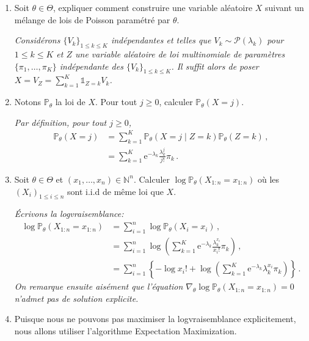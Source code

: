 \documentclass[a4paper,10pt,fleqn]{article}
\newcommand{\1}{\ensuremath{\mathbbm{1}}}
\begin{document}
\begin{enumerate}
\item Soit $\theta\in\Theta$, expliquer comment construire une variable al\'eatoire $X$ suivant un m\'elange de lois de Poisson param\'etr\'e par $\theta$.

\vspace{.2cm}

{\em Consid\'erons $\{V_k\}_{1\leq k\leq K}$ ind\'ependantes et telles que $V_k\sim \mathcal{P}(\lambda_k)$ pour $1\leq k\leq K$ et $Z$ une variable al\'eatoire de loi multinomiale de param\`etres $\{\pi_1, \ldots,\pi_K\}$ ind\'ependante des $\{V_k\}_{1\leq k\leq K}$. Il suffit alors de poser $X = V_Z = \sum_{k=1}^K \mathds{1}_{Z=k}V_k$.}

\item Notons $\mathbb{P}_\theta$ la loi de $X$. Pour tout $j\geq 0$, calculer $\mathbb{P}_\theta(X=j)$.

\vspace{.2cm}

{\em Par d\'efinition, pour tout $j\geq 0$,
\begin{align*}
\mathbb{P}_\theta\left(X=j\right) &= \sum_{k=1}^K \mathbb{P}_\theta\left(X=j \middle |Z = k\right)\mathbb{P}_\theta\left(Z = k\right)\,,\\
&=  \sum_{k=1}^K \mathrm{e}^{-\lambda_k}\frac{\lambda_k^j}{j!}\pi_k\,.
\end{align*}}
\item Soit $\theta\in\Theta$ et $(x_1,\ldots,x_n)\in\mathbb{N}^n$. Calculer $\log \mathbb{P}_\theta(X_{1:n}=x_{1:n}) $ o\`u les $(X_i)_{1\leq i \leq n}$ sont i.i.d de m\^eme loi que $X$.

\vspace{.2cm}

{\em \'Ecrivons la logvraisemblance:
\begin{align*}
\log \mathbb{P}_\theta\left(X_{1:n}=x_{1:n}\right) &= \sum_{i=1}^n\log \mathbb{P}_\theta\left(X_{i}=x_{i}\right)\,,\\
&=\sum_{i=1}^n\log \left(\sum_{k=1}^K \mathrm{e}^{-\lambda_k}\frac{\lambda_k^{x_i}}{x_i!}\pi_k\right)\,,\\
&=\sum_{i=1}^n\left\{-\log  x_i! + \log \left(\sum_{k=1}^K \mathrm{e}^{-\lambda_k}\lambda_k^{x_i} \pi_k\right)\right\}\,.
\end{align*}
On remarque ensuite ais\'ement que l'\'equation $\nabla_\theta \log \mathbb{P}_\theta\left(X_{1:n}=x_{1:n}\right)  = 0$ n'admet pas de solution explicite.}
\item Puisque nous ne pouvons pas maximiser la logvraisemblance explicitement, nous allons utiliser l'algorithme Expectation Maximization.


\end{enumerate}
\end{document}
